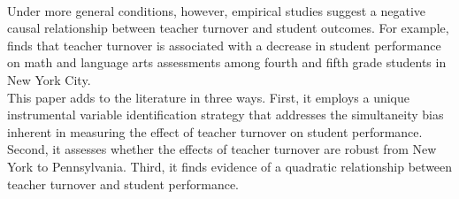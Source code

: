 \documentclass[12pt]{report}
\begin{document}
\\
\indent Under more general conditions, however, empirical studies suggest a negative causal relationship between teacher turnover and student outcomes. For example, \cite{ronfeldt} finds that teacher turnover is associated with a decrease in student performance on math and language arts assessments among fourth and fifth grade students in New York City. \\
\indent This paper adds to the literature in three ways. First, it employs a unique instrumental variable identification strategy that addresses the simultaneity bias inherent in measuring the effect of teacher turnover on student performance. Second, it assesses whether the effects of teacher turnover are robust from New York to Pennsylvania. Third, it finds evidence of a quadratic relationship between teacher turnover and student performance. 
\end{document}
